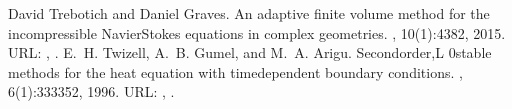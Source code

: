 \documentclass[letterpaper,10pt,english]{sphinxmanual}
\begin{document}
\begin{sphinxthebibliography}{1}
David Trebotich and Daniel Graves. An adaptive finite volume method for the incompressible Navier\textendash{}Stokes equations in complex geometries. , 10(1):43\textendash{}82, 2015. URL: , .
E. H. Twizell, A. B. Gumel, and M. A. Arigu. Second\sphinxhyphen{}order,L 0\sphinxhyphen{}stable methods for the heat equation with time\sphinxhyphen{}dependent boundary conditions. , 6(1):333\textendash{}352, 1996. URL: , .
\end{sphinxthebibliography}



\renewcommand{\indexname}{Index}
\printindex
\end{document}
